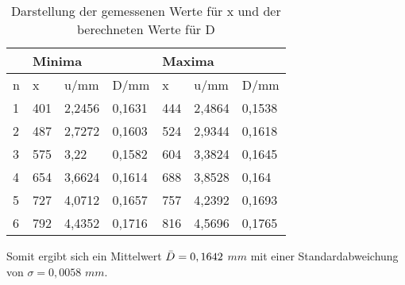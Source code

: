 \documentclass[../protokoll.tex]{subfiles}
\begin{document}
\begin{table}[h]
\centering
\begin{tabular}{|l|lll|lll|}
\hline
  & \multicolumn{3}{l|}{Minima}                                     & \multicolumn{3}{l|}{Maxima}                                     \\ \hline
n & \multicolumn{1}{l|}{x}   & \multicolumn{1}{l|}{u/mm}   & D/mm   & \multicolumn{1}{l|}{x}   & \multicolumn{1}{l|}{u/mm}   & D/mm   \\ \hline
1 & \multicolumn{1}{l|}{401} & \multicolumn{1}{l|}{2,2456} & 0,1631 & \multicolumn{1}{l|}{444} & \multicolumn{1}{l|}{2,4864} & 0,1538 \\ \hline
2 & \multicolumn{1}{l|}{487} & \multicolumn{1}{l|}{2,7272} & 0,1603 & \multicolumn{1}{l|}{524} & \multicolumn{1}{l|}{2,9344} & 0,1618 \\ \hline
3 & \multicolumn{1}{l|}{575} & \multicolumn{1}{l|}{3,22}   & 0,1582 & \multicolumn{1}{l|}{604} & \multicolumn{1}{l|}{3,3824} & 0,1645 \\ \hline
4 & \multicolumn{1}{l|}{654} & \multicolumn{1}{l|}{3,6624} & 0,1614 & \multicolumn{1}{l|}{688} & \multicolumn{1}{l|}{3,8528} & 0,164  \\ \hline
5 & \multicolumn{1}{l|}{727} & \multicolumn{1}{l|}{4,0712} & 0,1657 & \multicolumn{1}{l|}{757} & \multicolumn{1}{l|}{4,2392} & 0,1693 \\ \hline
6 & \multicolumn{1}{l|}{792} & \multicolumn{1}{l|}{4,4352} & 0,1716 & \multicolumn{1}{l|}{816} & \multicolumn{1}{l|}{4,5696} & 0,1765 \\ \hline
\end{tabular}
\caption{Darstellung der gemessenen Werte für x und der berechneten Werte für D}
\label{tab11}
\end{table}
Somit ergibt sich ein Mittelwert $\Bar{D}=0,1642$ $mm$ mit einer Standardabweichung von $\sigma=0,0058$ $mm$.
\end{document}
